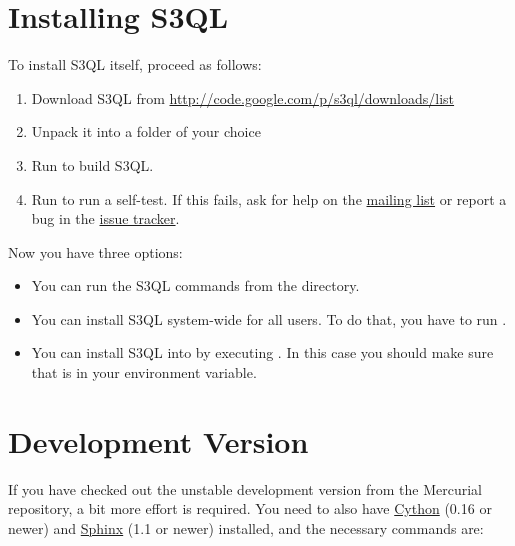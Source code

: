 \documentclass[letterpaper,10pt,english]{sphinxmanual}
\begin{document}
\section{Installing S3QL}
\label{installation:inst-s3ql}\label{installation:installing-s3ql}
To install S3QL itself, proceed as follows:
\begin{enumerate}
\item {} 
Download S3QL from \href{http://code.google.com/p/s3ql/downloads/list}{http://code.google.com/p/s3ql/downloads/list}

\item {} 
Unpack it into a folder of your choice

\item {} 
Run  to build S3QL.

\item {} 
Run  to run a self-test. If this fails, ask
for help on the \href{http://groups.google.com/group/s3ql}{mailing list} or report a bug in the
\href{http://code.google.com/p/s3ql/issues/list}{issue tracker}.

\end{enumerate}

Now you have three options:
\begin{itemize}
\item {} 
You can run the S3QL commands from the  directory.

\item {} 
You can install S3QL system-wide for all users. To do that, you
have to run .

\item {} 
You can install S3QL into  by executing . In this case you should make sure that
 is in your  environment variable.

\end{itemize}


\section{Development Version}
\label{installation:development-version}
If you have checked out the unstable development version from the
Mercurial repository, a bit more effort is required. You need to also
have \href{http://www.cython.org/}{Cython} (0.16 or newer) and \href{http://sphinx.pocoo.org/}{Sphinx} (1.1 or newer) installed, and
the necessary commands are:
\end{document}
